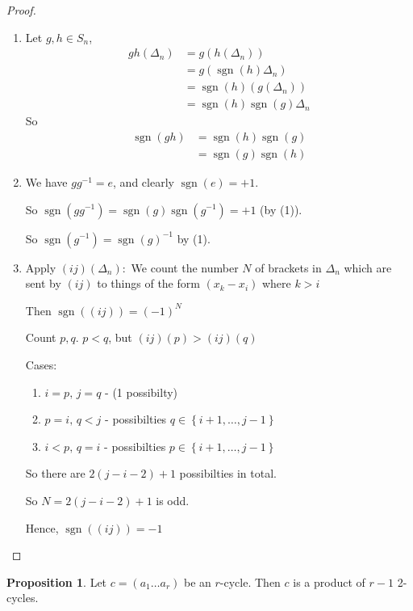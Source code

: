 \documentclass{article}
\theoremstyle{definition}
\newtheorem{proposition}{Proposition}
\newcommand{\dtn}{\Delta_n}
\DeclareMathOperator{\sgn}{sgn}
\begin{document}
\begin{proof}\hfill
  \begin{enumerate}
    \item Let $g,h \in S_n$,
      \begin{align*}
        gh(\dtn) &= g(h(\dtn)) \\
                 &= g(\sgn(h)\dtn) \\
                 &= \sgn(h)(g(\dtn)) \\
                 &= \sgn(h) \sgn(g) \dtn
      \end{align*}
      So 
      \begin{align*}
        \sgn(gh) &= \sgn(h)\sgn(g) \\
                 &= \sgn(g)\sgn(h)
      \end{align*}

    \item We have $g g^{-1}=e$, and clearly $\sgn(e) = +1$. 

      So $\sgn(g g^{-1})=\sgn(g)\sgn(g^{-1})=+1$ (by (1)).

      So $\sgn(g^{-1})=\sgn(g)^{-1}$ by (1).

    \item Apply $(ij)(\dtn):$
      We count the number $N$ of brackets in $\dtn$ which are sent by $(ij)$ to things of the form $(x_k - x_i)$ where $k>i$ 

      Then $\sgn\left( (ij) \right)=(-1)^N$

      Count $p,q$. $p<q$, but $(ij)(p)>(ij)(q)$

      Cases: 
      \begin{enumerate}
        \item $i=p,\, j=q$ - (1 possibilty)
        \item $p=i,\,q<j$ - possibilties $q \in \left\{ i+1, \ldots, j-1 \right\}$
        \item $i<p,\,q=i$ - possibilties $p \in \left\{ i+1, \ldots , j-1 \right\}$
      \end{enumerate}
      So there are $2(j-i-2) +1$ possibilties in total.

      So $N=2(j-i-2)+1$ is odd. 

      Hence, $\sgn\left( (ij) \right)=-1$
  \end{enumerate}
\end{proof}

\begin{proposition}
  \label{prp:2cycles}
  Let $c=(a_1 \ldots a_r)$ be an $r$-cycle. Then $c$ is a product of $r-1$ 2-cycles.
\end{proposition}
\end{document}
